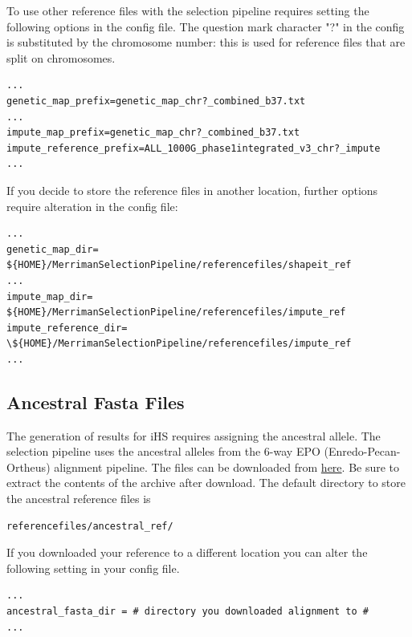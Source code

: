 \documentclass[a4paper,10pt]{article}
\begin{document}
To use other reference files with the selection pipeline requires
setting the following options in the config file. The question mark character
"?" in the config is substituted by the chromosome number: this is
used for reference files that are split on chromosomes.\\


\begin{verbatim}
...
genetic_map_prefix=genetic_map_chr?_combined_b37.txt
...
impute_map_prefix=genetic_map_chr?_combined_b37.txt
impute_reference_prefix=ALL_1000G_phase1integrated_v3_chr?_impute
...
\end{verbatim}

\noindent
If you decide to store the reference files in another location,
further options require alteration in the config file:\\ 
\begin{verbatim}
...
genetic_map_dir= ${HOME}/MerrimanSelectionPipeline/referencefiles/shapeit_ref
...
impute_map_dir= ${HOME}/MerrimanSelectionPipeline/referencefiles/impute_ref
impute_reference_dir= \${HOME}/MerrimanSelectionPipeline/referencefiles/impute_ref
...
\end{verbatim}

\subsection{Ancestral Fasta Files}
The generation of results for iHS requires assigning the ancestral
allele. The selection pipeline uses the ancestral alleles from the
6-way EPO (Enredo-Pecan-Ortheus) alignment pipeline. The files can be
downloaded from
\href{ftp://ftp.1000genomes.ebi.ac.uk/vol1/ftp/phase1/analysis_results/supporting/ancestral_alignments/human_ancestor_GRCh37_e59.tar.bz2}{here}. Be
sure to extract the contents of the archive after download. The default
directory to store the ancestral reference files is\\
\begin{verbatim}
referencefiles/ancestral_ref/
\end{verbatim}

\noindent
If you downloaded your reference to a different location you can alter the following setting in your config file.\\
\begin{verbatim}
...
ancestral_fasta_dir = # directory you downloaded alignment to #
...
\end{verbatim}
\end{document}
